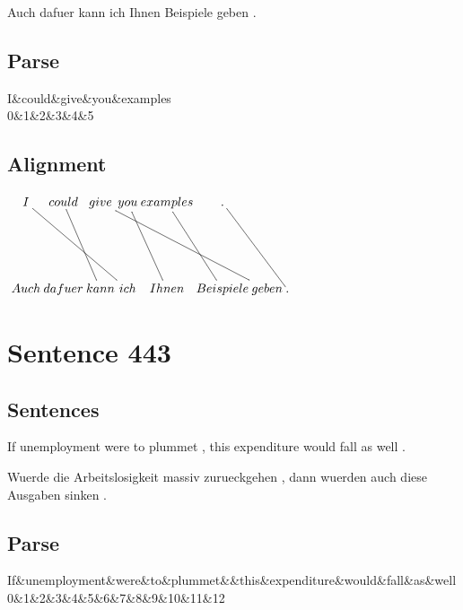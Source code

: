 \documentclass{report}
\begin{document}
\noindent Auch dafuer kann ich Ihnen Beispiele geben .



\subsection*{Parse}
\begin{dependency}[theme=simple]
\begin{deptext}[column sep=.5cm, row sep=.1ex]
I\&could\&give\&you\&examples\\
0\&1\&2\&3\&4\&5\\
\end{deptext}
\end{dependency}


\subsection*{Alignment}
\scriptsize{
$
\xymatrix@C-2.3pc{
I \ar @{-} [ddrrr] & could \ar @{-} [ddr] & give \ar @{-} [ddrrrr] & you \ar @{-} [ddr] & examples \ar @{-} [ddr] & . \ar @{-} [ddrr]\\\\
Auch & dafuer & kann & ich & Ihnen & Beispiele & geben & .
}$}
\newpage\section*{Sentence 443}

\subsection*{Sentences}
If unemployment were to plummet , this expenditure would fall as well .

\noindent Wuerde die Arbeitslosigkeit massiv zurueckgehen , dann wuerden auch diese Ausgaben sinken .



\subsection*{Parse}
\begin{dependency}[theme=simple]
\begin{deptext}[column sep=.5cm, row sep=.1ex]
If\&unemployment\&were\&to\&plummet\&\&this\&expenditure\&would\&fall\&as\&well\\
0\&1\&2\&3\&4\&5\&6\&7\&8\&9\&10\&11\&12\\
\end{deptext}
\end{dependency}
\end{document}
